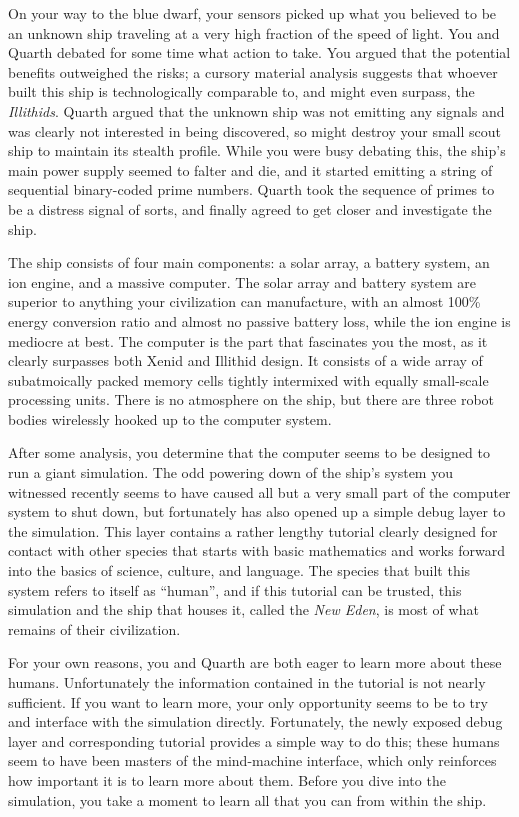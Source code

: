 \documentclass[char]{guildcamp1}
\begin{document}
On your way to the blue dwarf, your sensors picked up what you believed to be an unknown ship traveling at a very high fraction of the speed of light. You and Quarth debated for some time what action to take. You argued that the potential benefits outweighed the risks; a cursory material analysis suggests that whoever built this ship is technologically comparable to, and might even surpass, the \emph{Illithids}. Quarth argued that the unknown ship was not emitting any signals and was clearly not interested in being discovered, so might destroy your small scout ship to maintain its stealth profile. While you were busy debating this, the ship's main power supply seemed to falter and die, and it started emitting a string of sequential binary-coded prime numbers. Quarth took the sequence of primes to be a distress signal of sorts, and finally agreed to get closer and investigate the ship.

The ship consists of four main components: a solar array, a battery system, an ion engine, and a massive computer. The solar array and battery system are superior to anything your civilization can manufacture, with an almost 100\% energy conversion ratio and almost no passive battery loss, while the ion engine is mediocre at best. The computer is the part that fascinates you the most, as it clearly surpasses both Xenid and Illithid design. It consists of a wide array of subatmoically packed memory cells tightly intermixed with equally small-scale processing units. There is no atmosphere on the ship, but there are three robot bodies wirelessly hooked up to the computer system.

After some analysis, you determine that the computer seems to be designed to run a giant simulation. The odd powering down of the ship's system you witnessed recently seems to have caused all but a very small part of the computer system to shut down, but fortunately has also opened up a simple debug layer to the simulation. This layer contains a rather lengthy tutorial clearly designed for contact with other species that starts with basic mathematics and works forward into the basics of science, culture, and language. The species that built this system refers to itself as ``human'', and if this tutorial can be trusted, this simulation and the ship that houses it, called the \emph{New Eden}, is most of what remains of their civilization.

For your own reasons, you and Quarth are both eager to learn more about these humans. Unfortunately the information contained in the tutorial is not nearly sufficient. If you want to learn more, your only opportunity seems to be to try and interface with the simulation directly. Fortunately, the newly exposed debug layer and corresponding tutorial provides a simple way to do this; these humans seem to have been masters of the mind-machine interface, which only reinforces how important it is to learn more about them. Before you dive into the simulation, you take a moment to learn all that you can from within the ship.
\end{document}
